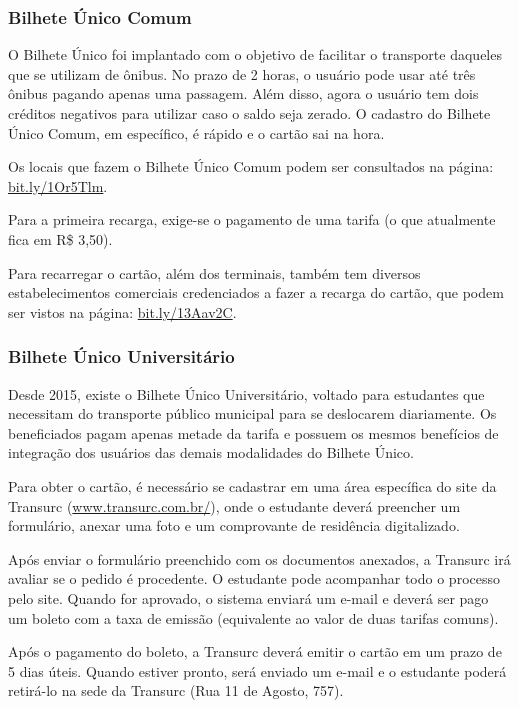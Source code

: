 \subsubsection*{Bilhete Único Comum}

O Bilhete Único foi implantado com o objetivo de facilitar o transporte daqueles
que se utilizam de ônibus. No prazo de 2 horas, o usuário pode usar até três
ônibus pagando apenas uma passagem. Além disso, agora o usuário tem dois
créditos negativos para utilizar caso o saldo seja zerado. O cadastro do
Bilhete Único Comum, em específico, é rápido e o cartão sai na hora.

Os locais que fazem o Bilhete Único Comum podem ser consultados na página: 
\url{bit.ly/1Or5Tlm}.

Para a primeira recarga, exige-se o pagamento de uma tarifa (o que atualmente
fica em R\$ 3,50).

Para recarregar o cartão, além dos terminais, também tem diversos
estabelecimentos comerciais credenciados a fazer a recarga do cartão, que podem
ser vistos na página: \url{bit.ly/13Aav2C}.

\subsubsection*{Bilhete Único Universitário}

Desde 2015, existe o Bilhete Único Universitário, voltado para estudantes que
necessitam do transporte público municipal para se deslocarem diariamente. Os
beneficiados pagam apenas metade da tarifa e possuem os mesmos benefícios de
integração dos usuários das demais modalidades do Bilhete Único.

Para obter o cartão, é necessário se cadastrar em uma área específica do site
da Transurc (\url{www.transurc.com.br/}), onde o estudante deverá preencher
um formulário, anexar uma foto e um comprovante de residência digitalizado.

Após enviar o formulário preenchido com os documentos anexados, a Transurc
irá avaliar se o pedido é procedente. O estudante pode acompanhar todo o
processo pelo site. Quando for aprovado, o sistema enviará um e-mail e deverá
ser pago um boleto com a taxa de emissão (equivalente ao valor de duas
tarifas comuns).

Após o pagamento do boleto, a Transurc deverá emitir o cartão em um prazo de
5 dias úteis. Quando estiver pronto, será enviado um e-mail e o estudante
poderá retirá-lo na sede da Transurc (Rua 11 de Agosto, 757).

